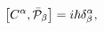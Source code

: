 \begin{equation}
\left[  C^{\alpha},\bar{{\cal P}}_{\beta}\right]  =i\hbar\delta_{\beta
}^{\alpha},\label{2.2}%
\end{equation}

